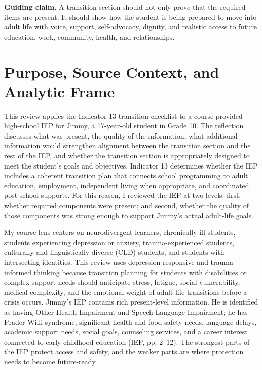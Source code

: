 \documentclass[11pt]{article}
\begin{document}
\begin{ReflectionBox}
\textbf{Guiding claim.} A transition section should not only prove that the required items are present. It should show how the student is being prepared to move into adult life with voice, support, self-advocacy, dignity, and realistic access to future education, work, community, health, and relationships.
\end{ReflectionBox}

\section{Purpose, Source Context, and Analytic Frame}

This review applies the Indicator 13 transition checklist to a course-provided high-school IEP for Jimmy, a 17-year-old student in Grade 10. The reflection discusses what was present, the quality of the information, what additional information would strengthen alignment between the transition section and the rest of the IEP, and whether the transition section is appropriately designed to meet the student's goals and objectives. Indicator 13 determines whether the IEP includes a coherent transition plan that connects school programming to adult education, employment, independent living when appropriate, and coordinated post-school supports. For this reason, I reviewed the IEP at two levels: first, whether required components were present; and second, whether the quality of those components was strong enough to support Jimmy's actual adult-life goals.

My course lens centers on neurodivergent learners, chronically ill students, students experiencing depression or anxiety, trauma-experienced students, culturally and linguistically diverse (CLD) students, and students with intersecting identities. This review uses depression-responsive and trauma-informed thinking because transition planning for students with disabilities or complex support needs should anticipate stress, fatigue, social vulnerability, medical complexity, and the emotional weight of adult-life transitions before a crisis occurs. Jimmy's IEP contains rich present-level information. He is identified as having Other Health Impairment and Speech Language Impairment; he has Prader-Willi syndrome, significant health and food-safety needs, language delays, academic support needs, social goals, counseling services, and a career interest connected to early childhood education (IEP, pp. 2--12). The strongest parts of the IEP protect access and safety, and the weaker parts are where protection needs to become future-ready.
\end{document}
